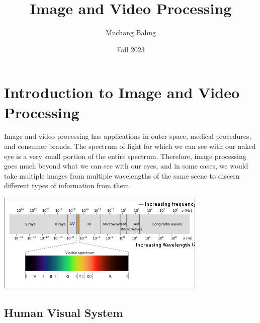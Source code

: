 \documentclass{article}
\begin{document}
\title{Image and Video Processing}
\author{Muchang Bahng}
\date{Fall 2023}

\maketitle
\tableofcontents
\pagebreak

\section{Introduction to Image and Video Processing}

    Image and video processing has applications in outer space, medical procedures, and consumer brands. The spectrum of light for which we can see with our naked eye is a very small portion of the entire spectrum. Therefore, image processing goes much beyond what we can see with our eyes, and in some cases, we would take multiple images from multiple wavelengths of the same scene to discern different types of information from them. 

    \begin{center}
        \includegraphics[scale=0.7]{img/em_spectrum.png}
    \end{center}

  \subsection{Human Visual System}
\end{document}

